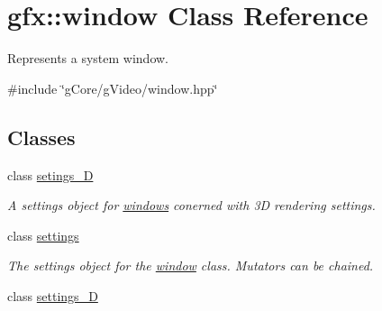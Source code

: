 \hypertarget{classgfx_1_1window}{\section{gfx\-:\-:window Class Reference}
\label{classgfx_1_1window}
}


Represents a system window.  




{\ttfamily \#include \char`\"{}g\-Core/g\-Video/window.\-hpp\char`\"{}}

\subsection*{Classes}
\begin{DoxyCompactItemize}
\item 
class \hyperlink{classgfx_1_1window_1_1setings__3D}{setings\-\_\-D}
\begin{DoxyCompactList}\small\item\em A settings object for \hyperlink{classgfx_1_1window}{windows} conerned with 3\-D rendering settings. \end{DoxyCompactList}\item 
class \hyperlink{classgfx_1_1window_1_1settings}{settings}
\begin{DoxyCompactList}\small\item\em The settings object for the \hyperlink{classgfx_1_1window}{window} class. Mutators can be chained. \end{DoxyCompactList}\item 
class \hyperlink{classgfx_1_1window_1_1settings__3D}{settings\-\_\-D}
\end{DoxyCompactItemize}
